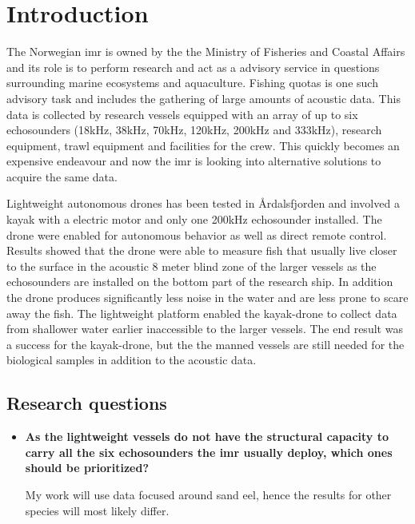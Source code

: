 \chapter{Introduction}

    The Norwegian \gls{imr} is owned by the the Ministry of Fisheries and Coastal Affairs and its role is to perform research and act as a advisory service in questions surrounding marine ecosystems and aquaculture\cite{IMR}. Fishing quotas is one such advisory task and includes the gathering of large amounts of acoustic data. This data is collected by research vessels\cite{IMR-vessels} equipped with an array of up to six echosounders (18kHz, 38kHz, 70kHz, 120kHz, 200kHz and 333kHz), research equipment, trawl equipment and facilities for the crew. This quickly becomes an expensive endeavour and now the \gls{imr} is looking into alternative solutions to acquire the same data. 
    
    Lightweight autonomous drones\cite{johnsen2020measuring} has been tested in Årdalsfjorden and involved a kayak with a electric motor and only one 200kHz echosounder installed. The drone were enabled for autonomous behavior as well as direct remote control. Results showed that the drone were able to measure fish that usually live closer to the surface in the acoustic 8 meter blind zone of the larger vessels as the echosounders are installed on the bottom part of the research ship. In addition the drone produces significantly less noise in the water and are less prone to scare away the fish. The lightweight platform enabled the kayak-drone to collect data from shallower water earlier inaccessible to the larger vessels. The end result was a success for the kayak-drone, but the the manned vessels are still needed for the biological samples in addition to the acoustic data. 
    
    
    

\section{Research questions}
    \begin{itemize}
        \item \textbf{As the lightweight vessels do not have the structural capacity to carry all the six echosounders the \gls{imr} usually deploy, which ones should be prioritized?}
        
        My work will use data focused around sand eel, hence the results for other species will most likely differ.

\end{itemize}


